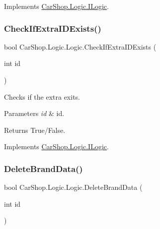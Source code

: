 Implements \mbox{\hyperlink{interface_car_shop_1_1_logic_1_1_i_logic_ab82e00aae902a6d7417b586487568d93}{Car\+Shop.\+Logic.\+I\+Logic}}.

\mbox{\label{class_car_shop_1_1_logic_1_1_logic_a1c3a42d859ae472db17293626b87ff30}} 
\subsubsection{\texorpdfstring{Check\+If\+Extra\+I\+D\+Exists()}{CheckIfExtraIDExists()}}
{\footnotesize\ttfamily bool Car\+Shop.\+Logic.\+Logic.\+Check\+If\+Extra\+I\+D\+Exists (\begin{DoxyParamCaption}\item[{int}]{id }\end{DoxyParamCaption})}



Checks if the extra exits. 


\begin{DoxyParams}{Parameters}
{\em id} & id.\\
\hline
\end{DoxyParams}
\begin{DoxyReturn}{Returns}
True/\+False.
\end{DoxyReturn}


Implements \mbox{\hyperlink{interface_car_shop_1_1_logic_1_1_i_logic_a86f7d6d049a74365b7bc3e135f11a539}{Car\+Shop.\+Logic.\+I\+Logic}}.

\mbox{\label{class_car_shop_1_1_logic_1_1_logic_a279fc9fc6ff803ce74bcba0e898ddad4}} 
\subsubsection{\texorpdfstring{Delete\+Brand\+Data()}{DeleteBrandData()}}
{\footnotesize\ttfamily bool Car\+Shop.\+Logic.\+Logic.\+Delete\+Brand\+Data (\begin{DoxyParamCaption}\item[{int}]{id }\end{DoxyParamCaption})}




